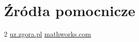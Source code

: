 \documentclass[]{article}
\begin{document}
\section*{Źródła pomocnicze}
\begin{thebibliography}{2}
	\href{https://staff.uz.zgora.pl/esylwest/pliki/Wyk3_mat_ET.pdf}{uz.zgora.pl}
	\href{https://ch.mathworks.com/help/matlab/index.html?s_tid=hc_panel}{mathworks.com}

\end{thebibliography}
\end{document}
